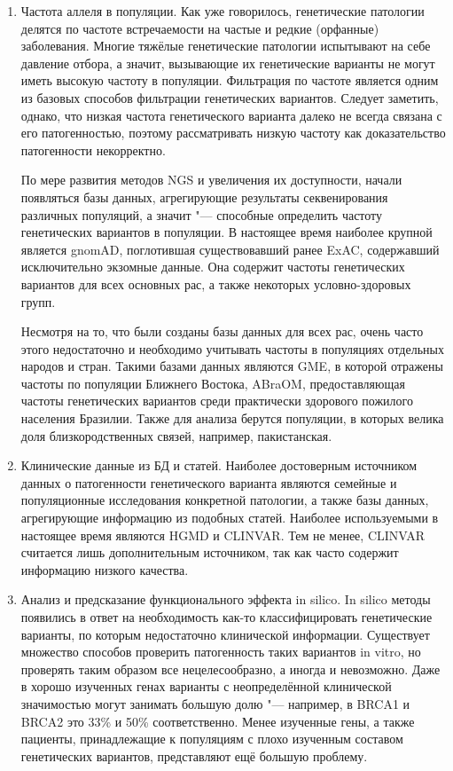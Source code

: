 \documentclass[a4paper,12pt]{article}
\begin{document}
\begin{enumerate}
\item Частота аллеля в популяции.
Как уже говорилось, генетические патологии делятся по частоте встречаемости на частые и редкие (орфанные) заболевания.
Многие тяжёлые генетические патологии испытывают на себе давление отбора, а значит, вызывающие их генетические варианты не могут иметь высокую частоту в популяции.
Фильтрация по частоте является одним из базовых способов фильтрации генетических вариантов.
Следует заметить, однако, что низкая частота генетического варианта далеко не всегда связана с его патогенностью, поэтому рассматривать низкую частоту как доказательство патогенности некорректно.

По мере развития методов NGS и увеличения их доступности, начали появляться базы данных, агрегирующие результаты секвенирования различных популяций, а значит "--- способные определить частоту генетических вариантов в популяции.
В настоящее время наиболее крупной является gnomAD\cite{gnomad}, поглотившая существовавший ранее ExAC, содержавший исключительно экзомные данные.
Она содержит частоты генетических вариантов для всех основных рас, а также некоторых условно-здоровых групп.

Несмотря на то, что были созданы базы данных для всех рас, очень часто этого недостаточно и необходимо учитывать частоты в популяциях отдельных народов и стран.
Такими базами данных являются GME\cite{gme}, в которой отражены частоты по популяции Ближнего Востока, ABraOM\cite{abraom}, предоставляющая частоты генетических вариантов среди практически здорового пожилого населения Бразилии.
Также для анализа берутся популяции, в которых велика доля близкородственных связей, например, пакистанская\cite{saleheen}.

\item Клинические данные из БД и статей.
Наиболее достоверным источником данных о патогенности генетического варианта являются семейные и популяционные исследования конкретной патологии, а также базы данных, агрегирующие информацию из подобных статей.
Наиболее используемыми в настоящее время являются HGMD\cite{hgmd} и CLINVAR.
Тем не менее, CLINVAR считается лишь дополнительным источником, так как часто содержит информацию низкого качества\cite{ryzhkova}.

\item Анализ и предсказание функционального эффекта in silico.
In silico методы появились в ответ на необходимость как-то классифицировать генетические варианты, по которым недостаточно клинической информации.
Существует множество способов проверить патогенность таких вариантов in vitro, но проверять таким образом все нецелесообразно, а иногда и невозможно.
Даже в хорошо изученных генах варианты с неопределённой клинической значимостью могут занимать большую долю "--- например, в BRCA1 и BRCA2 это 33\% и 50\% соответственно.
Менее изученные гены, а также пациенты, принадлежащие к популяциям с плохо изученным составом генетических вариантов, представляют ещё большую проблему.


\end{enumerate}
\end{document}
